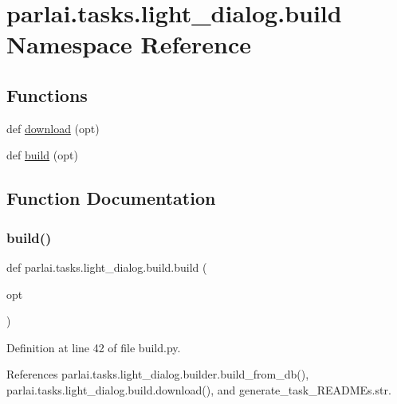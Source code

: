 \hypertarget{namespaceparlai_1_1tasks_1_1light__dialog_1_1build}{}\section{parlai.\+tasks.\+light\+\_\+dialog.\+build Namespace Reference}
\label{namespaceparlai_1_1tasks_1_1light__dialog_1_1build}
\subsection*{Functions}
\begin{DoxyCompactItemize}
\item 
def \hyperlink{namespaceparlai_1_1tasks_1_1light__dialog_1_1build_af4e1d56472312e493c43483a2dfff5a3}{download} (opt)
\item 
def \hyperlink{namespaceparlai_1_1tasks_1_1light__dialog_1_1build_ac8ebc5da2dd660257535226b26afb26e}{build} (opt)
\end{DoxyCompactItemize}


\subsection{Function Documentation}
\mbox{\label{namespaceparlai_1_1tasks_1_1light__dialog_1_1build_ac8ebc5da2dd660257535226b26afb26e}} 
\subsubsection{\texorpdfstring{build()}{build()}}
{\footnotesize\ttfamily def parlai.\+tasks.\+light\+\_\+dialog.\+build.\+build (\begin{DoxyParamCaption}\item[{}]{opt }\end{DoxyParamCaption})}



Definition at line 42 of file build.\+py.



References parlai.\+tasks.\+light\+\_\+dialog.\+builder.\+build\+\_\+from\+\_\+db(), parlai.\+tasks.\+light\+\_\+dialog.\+build.\+download(), and generate\+\_\+task\+\_\+\+R\+E\+A\+D\+M\+Es.\+str.

